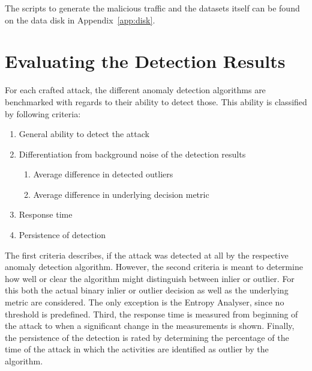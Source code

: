 The scripts to generate the malicious traffic and the datasets itself can be found on the data disk in Appendix~\ref{app:disk}.

\newpage
\section{Evaluating the Detection Results}
\label{sec:methods:eval}

For each crafted attack, the different anomaly detection algorithms are benchmarked with regards to their ability to detect those.
This ability is classified by following criteria:
\begin{enumerate}
	\item General ability to detect the attack
	\item Differentiation from background noise of the detection results
		\begin{enumerate}
			\item Average difference in detected outliers
			\item Average difference in underlying decision metric
		\end{enumerate}
	\item Response time 
	\item Persistence of detection
\end{enumerate}

The first criteria describes, if the attack was detected at all by the respective anomaly detection algorithm.
However, the second criteria is meant to determine how well or clear the algorithm might distinguish between inlier or outlier. For this both the actual binary inlier or outlier decision as well as the underlying metric are considered. The only exception is the Entropy Analyser, since no threshold is predefined.
Third, the response time is measured from beginning of the attack to when a significant change in the measurements is shown.
Finally, the persistence of the detection is rated by determining the percentage of the time of the attack in which the activities are identified as outlier by the algorithm.

\begin{comment}
Angriffe:

DoS
	Kurzschluss im Bus -> DoS auf gesamtem Segment
	A_Restart-Pakete -> DoS gegen einzelne Teilnehmer
Replay-Angriffe
	Zeit mitschneiden -> wiedergeben
	Tag mitschneiden, komprimiert wiedergeben
Manipulation von Paketen (Payload tauschen)
Konfiguration manipulieren
Überwindung von Linienkopplern
Address-Spoofing
	falsche Adresse in Liniensegment
	mit existierender Adresse senden
Netzanalyse mit knxMap (https://github.com/takeshixx/knxmap)
Mitlesen und sofort gegenteilige Aktion auslösen
High-Level-Angriffe:
	nur best. Aktionen zulassen
	Provokation/Sabotage von menschl. Verhalten
Social-Engineering -> Einschleusen von Geräten
\end{comment}